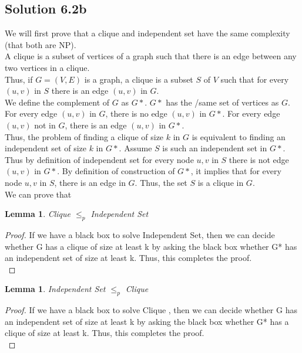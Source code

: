 \documentclass{article}
\theoremstyle{definition}
\theoremstyle{remark}
\theoremstyle{plain}
\newtheorem{lem}[thm]{Lemma}
\begin{document}
\subsection*{Solution 6.2b}

We will first prove that a clique and independent set have the same complexity (that both are NP). \\

A clique is a subset of vertices of a graph such that there is an edge between any two vertices in a clique.\\

Thus, if $G = (V,E)$ is a graph, a clique is a subset $S$ of $V$ such that for every $(u,v)$ in $S$ there is an edge $(u,v)$ in $G$.\\

We define the complement of $G$ as $G*$.  $G*$ has the /same set of vertices as $G$.  For every edge $(u,v)$ in $G$, there is no edge $(u,v)$ in $G*$.  For every edge $(u,v)$ not in $G$, there is an edge $(u,v)$ in $G*$.\\

Thus, the problem of finding a clique of size $k$ in $G$ is equivalent to finding an independent set of size $k$ in $G*$.  Assume $S$ is such an independent set in $G*$.  Thus by definition of independent set for every node $u,v$ in $S$ there is not edge $(u,v)$ in $G*$.  By definition of construction of $G*$, it implies that for every node $u, v$ in $S$, there is an edge in $G$.  Thus, the set $S$ is a clique in $G$.\\

We can prove that\\

\begin{lem}
Clique $\leq _p$ Independent Set
\end{lem}
\begin{proof}
If we have a black box to solve Independent Set, then we can decide whether G has a clique of size at least k by asking the black box whether G* has an independent set of size at least k.
Thus, this completes the proof.\\
\end{proof}

\begin{lem}
Independent Set  $\leq _p$ Clique
\end{lem}
\begin{proof}
If we have a black box to solve Clique , then we can decide whether G has an independent set of size at least k by asking the black box whether G* has a clique of size at least k.
Thus, this completes the proof.\\
\end{proof}
\end{document}
